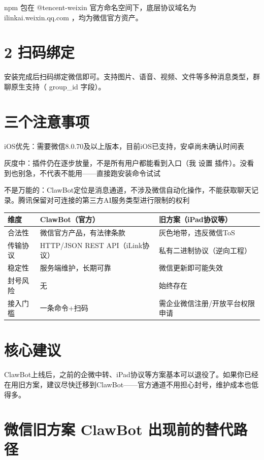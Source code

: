 \documentclass[
  10
]{article}
\newcounter{none} %
\begin{document}
npm 包在 @tencent-weixin 官方命名空间下，底层协议域名为
ilinkai.weixin.qq.com ，均为微信官方资产。

\section{2 扫码绑定}\label{ux626bux7801ux7ed1ux5b9a}

安装完成后扫码绑定微信即可。支持图片、语音、视频、文件等多种消息类型，群聊原生支持（
group\_id 字段）。

\section{三个注意事项}\label{ux4e09ux4e2aux6ce8ux610fux4e8bux9879}

iOS优先：需要微信8.0.70及以上版本，目前iOS已支持，安卓尚未确认时间表

灰度中：插件仍在逐步放量，不是所有用户都能看到入口（我 设置
插件）。没看到也别急，不代表不能用------直接跑安装命令试试

不是万能的：ClawBot定位是消息通道，不涉及微信自动化操作，不能获取聊天记录。腾讯保留对可连接的第三方AI服务类型进行限制的权利

{\def\LTcaptype{none} %
\begin{longtable}[]{@{}|l|l|l|@{}}
\toprule\noalign{}
\endhead
\bottomrule\noalign{}
\endlastfoot
\hline
维度 & ClawBot（官方） & 旧方案（iPad协议等） \\
\hline
合法性 & 微信官方产品，有法律条款 & 灰色地带，违反微信ToS \\
\hline
传输协议 & HTTP/JSON REST API（iLink协议） &
私有二进制协议（逆向工程） \\
\hline
稳定性 & 服务端维护，长期可靠 & 微信更新即可能失效 \\
\hline
封号风险 & 无 & 始终存在 \\
\hline
接入门槛 & 一条命令+扫码 & 需企业微信注册/开放平台权限申请 \\
\hline
\end{longtable}
}

\section{核心建议}\label{ux6838ux5fc3ux5efaux8bae-10}

ClawBot上线后，之前的企微中转、iPad协议等方案基本可以退役了。如果你已经在用旧方案，建议尽快迁移到ClawBot------官方通道不用担心封号，维护成本也低得多。

\section{微信旧方案 ClawBot
出现前的替代路径}\label{ux5faeux4fe1ux65e7ux65b9ux6848-clawbot-ux51faux73b0ux524dux7684ux66ffux4ee3ux8defux5f84}
\end{document}
